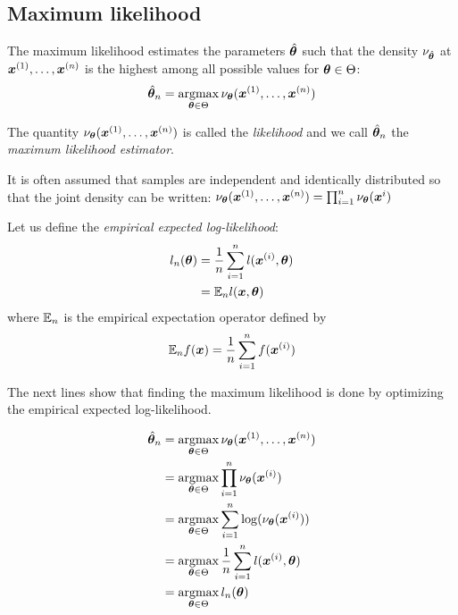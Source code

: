 \subsection{Maximum likelihood}
\label{sec:mlintro}
The maximum likelihood estimates the parameters $\hat{\boldsymbol{\theta}}$ such that the
density $\nu_{\hat{\boldsymbol{\theta}}}$ at $\boldsymbol{x}^{(1)}, \dots, \boldsymbol{x}^{(n)}$ is the highest among all possible
values for $\boldsymbol{\theta} \in \Theta$:
\begin{align}
  \hat{\boldsymbol{\theta}}_n = \operatorname*{argmax}_{\boldsymbol{\theta} \in \Theta} \nu_{\boldsymbol{\theta}}(\boldsymbol{x}^{(1)}, \dots, \boldsymbol{x}^{(n)})
\end{align}

The quantity $\nu_{\boldsymbol{\theta}}(\boldsymbol{x}^{(1)}, \dots, \boldsymbol{x}^{(n)})$ is called the
\emph{likelihood} and we call $\hat{\boldsymbol{\theta}}_n$ the \emph{maximum likelihood estimator}.

It is often assumed that samples are independent and identically distributed so that
the joint density can be written:
$\nu_{\boldsymbol{\theta}}(\boldsymbol{x}^{(1)}, \dots, \boldsymbol{x}^{(n)}) = \prod_{i=1}^n \nu_{\boldsymbol{\theta}}(\boldsymbol{x}^i)$

Let us define the \emph{empirical expected log-likelihood}:
\begin{align}
  l_n(\boldsymbol{\theta}) &= \frac1n
  \sum_{i=1}^n l(\boldsymbol{x}^{(i)}, \boldsymbol{\theta}) \\
               &= \mathbb{E}_n l(\boldsymbol{x}, \boldsymbol{\theta})
\end{align}
where $\mathbb{E}_n$ is the empirical expectation operator defined by
\begin{align}
\mathbb{E}_n f(\boldsymbol{x}) = \frac1{n} \sum_{i=1}^n f(\boldsymbol{x}^{(i)})
\end{align}


The next lines show that finding the maximum likelihood is done by optimizing
the empirical expected log-likelihood.


\begin{align}
  \hat{\boldsymbol{\theta}}_n &= \operatorname*{argmax}_{\boldsymbol{\theta} \in \Theta} \nu_{\boldsymbol{\theta}}(\boldsymbol{x}^{(1)}, \dots, \boldsymbol{x}^{(n)}) \\
               &= \operatorname*{argmax}_{\boldsymbol{\theta} \in \Theta} \prod_{i=1}^n \nu_{\boldsymbol{\theta}}(\boldsymbol{x}^{(i)}) \\ 
               &= \operatorname*{argmax}_{\boldsymbol{\theta} \in \Theta} \sum_{i=1}^n \log(\nu_{\boldsymbol{\theta}}(\boldsymbol{x}^{(i)}))  \\
               &= \operatorname*{argmax}_{\boldsymbol{\theta} \in \Theta} \frac1n \sum_{i=1}^n l(\boldsymbol{x}^{(i)}, \boldsymbol{\theta}) \\ 
                  &= \operatorname*{argmax}_{\boldsymbol{\theta} \in \Theta} l_n(\boldsymbol{\theta}) \\ 
\end{align}

